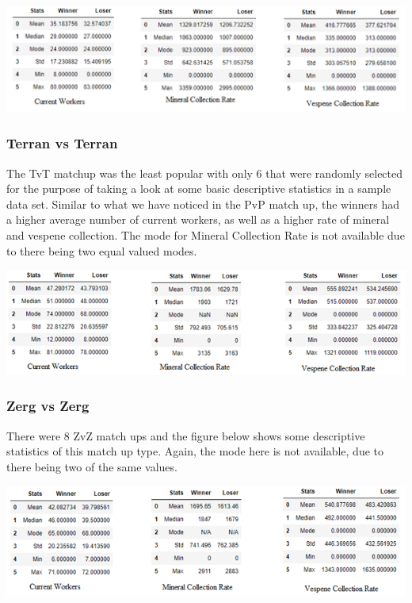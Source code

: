 \documentclass[a4paper,12pt]{report}
\begin{document}
\begin{center}
    \captionsetup{type=figure}
    \includegraphics[width=.9\linewidth]{media/WorkersCollection.png}
\end{center}

\subsubsection{Terran vs Terran}
The TvT matchup was the least popular with only 6 that were randomly selected for the purpose of taking a look at some basic descriptive statistics in a sample data set. Similar to what we have noticed in the PvP match up, the winners had a higher average number of current workers, as well as a higher rate of mineral and vespene collection. The mode for Mineral Collection Rate is not available due to there being two equal valued modes. 

\begin{center}
    \captionsetup{type=figure}
    \includegraphics[width=.9\linewidth]{media/WorkersCollectionTvT.png}
\end{center}

\subsubsection{Zerg vs Zerg}
There were 8 ZvZ match ups and the figure below shows some descriptive statistics of this match up type. Again, the mode here is not available, due to there being two of the same values. 

\begin{center}
    \captionsetup{type=figure}
    \includegraphics[width=.9\linewidth]{media/WorkersCollectionZvZ.png}
\end{center}
\end{document}
